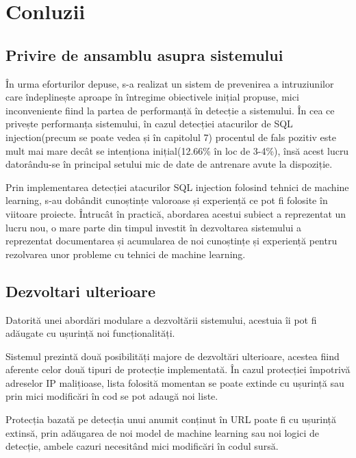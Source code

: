 
 \chapter{Conluzii}
\label{cap:concluzii}
\section{Privire de ansamblu asupra sistemului}

În urma eforturilor depuse, s-a realizat un sistem de prevenirea a intruziunilor care îndeplinește aproape în întregime obiectivele inițial propuse, mici inconveniente fiind la partea de performanță în detecție a sistemului. În cea ce privește performanța sistemului, în cazul detecției atacurilor de SQL injection(precum se poate vedea și în capitolul 7) procentul de fals pozitiv este mult mai mare decât se intenționa inițial(12.66\% în loc de 3-4\%), însă acest lucru datorându-se în principal setului mic de date de antrenare avute la dispoziție. 

Prin implementarea detecției atacurilor SQL injection folosind tehnici de machine learning, s-au dobândit cunoștințe valoroase și experiență ce pot fi folosite în viitoare proiecte. Întrucât în practică, abordarea acestui subiect a reprezentat un lucru nou, o mare parte din timpul investit în dezvoltarea sistemului a reprezentat documentarea și acumularea de noi cunoștințe și experiență pentru rezolvarea unor probleme cu tehnici de machine learning. 

\section{Dezvoltari ulterioare}

Datorită unei abordări modulare a dezvoltării sistemului, acestuia îi pot fi adăugate cu ușurință noi funcționalități. 

Sistemul prezintă două posibilități majore de dezvoltări ulterioare, acestea fiind aferente celor două tipuri de protecție implementată. În cazul protecției împotrivă adreselor IP malițioase, lista folosită momentan se poate extinde cu ușurință sau prin mici modificări în cod se pot adaugă noi liste. 

Protecția bazată pe detecția unui anumit conținut în URL poate fi cu ușurință extinsă, prin adăugarea de noi model de machine learning sau noi logici de detecție, ambele cazuri necesitând mici modificări în codul sursă. 

